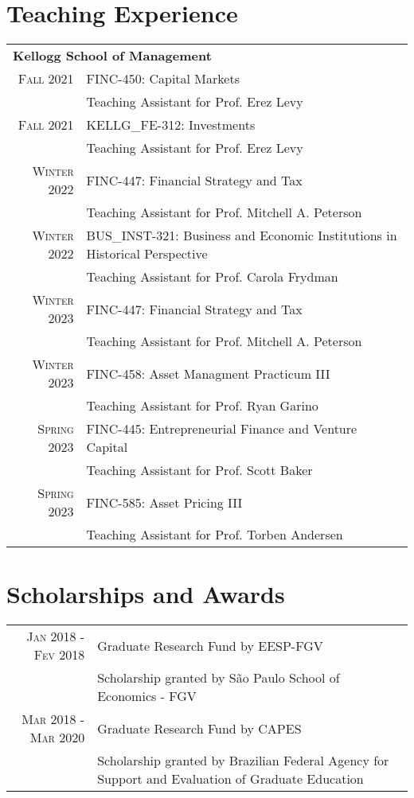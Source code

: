 \documentclass[a4paper,10pt]{article}
\begin{document}
\section{Teaching Experience}
\begin{tabular}{r|p{10.5cm}}
    \multicolumn{2}{l}{\large\textbf{Kellogg School of Management}} \\
    \textsc{Fall} 2021 & FINC-450: Capital Markets \\
    & \footnotesize{Teaching Assistant for Prof. Erez Levy} \\
    \textsc{Fall} 2021 & KELLG\_FE-312: Investments \\
    & \footnotesize{Teaching Assistant for Prof. Erez Levy} \\
    \textsc{Winter} 2022 & FINC-447: Financial Strategy and Tax \\
    & \footnotesize{Teaching Assistant for Prof. Mitchell A. Peterson} \\
    \textsc{Winter} 2022 & BUS\_INST-321: Business and Economic Institutions in Historical Perspective \\
    & \footnotesize{Teaching Assistant for Prof. Carola Frydman} \\
    \textsc{Winter} 2023 & FINC-447: Financial Strategy and Tax \\
    & \footnotesize{Teaching Assistant for Prof. Mitchell A. Peterson} \\
    \textsc{Winter} 2023 & FINC-458: Asset Managment Practicum III \\
    & \footnotesize{Teaching Assistant for Prof. Ryan Garino} \\
    \textsc{Spring} 2023 & FINC-445: Entrepreneurial Finance and Venture Capital \\
    & \footnotesize{Teaching Assistant for Prof. Scott Baker} \\
    \textsc{Spring} 2023 & FINC-585: Asset Pricing III \\
    & \footnotesize{Teaching Assistant for Prof. Torben Andersen} \\
\end{tabular}

\section{Scholarships and Awards}
\begin{tabular}{r|p{10.5cm}}
    \textsc{Jan} 2018 - \textsc{Fev} 2018 & Graduate Research Fund by EESP-FGV\\
    &\footnotesize{Scholarship granted by São Paulo School of Economics - FGV}
    \\
    \textsc{Mar} 2018 - \textsc{Mar} 2020 & Graduate Research Fund by CAPES\\
    &\footnotesize{Scholarship granted by Brazilian Federal Agency for Support and Evaluation of Graduate Education}
\end{tabular}
\end{document}
